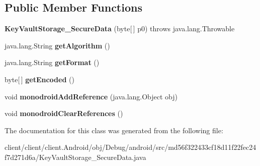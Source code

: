 \subsection*{Public Member Functions}
\begin{DoxyCompactItemize}
\item 
\hypertarget{classmd56f322433cf18d11f22fec24f7d271d6a_1_1KeyVaultStorage__SecureData_af12afd9550ec62b29d4b7789c72e3ad5}{}{\bfseries Key\+Vault\+Storage\+\_\+\+Secure\+Data} (byte\mbox{[}$\,$\mbox{]} p0)  throws java.\+lang.\+Throwable 	\label{classmd56f322433cf18d11f22fec24f7d271d6a_1_1KeyVaultStorage__SecureData_af12afd9550ec62b29d4b7789c72e3ad5}

\item 
\hypertarget{classmd56f322433cf18d11f22fec24f7d271d6a_1_1KeyVaultStorage__SecureData_a8c1ece5c0b0428451089108a2857e3a9}{}java.\+lang.\+String {\bfseries get\+Algorithm} ()\label{classmd56f322433cf18d11f22fec24f7d271d6a_1_1KeyVaultStorage__SecureData_a8c1ece5c0b0428451089108a2857e3a9}

\item 
\hypertarget{classmd56f322433cf18d11f22fec24f7d271d6a_1_1KeyVaultStorage__SecureData_a44d916ac765b3c441b206649c254911f}{}java.\+lang.\+String {\bfseries get\+Format} ()\label{classmd56f322433cf18d11f22fec24f7d271d6a_1_1KeyVaultStorage__SecureData_a44d916ac765b3c441b206649c254911f}

\item 
\hypertarget{classmd56f322433cf18d11f22fec24f7d271d6a_1_1KeyVaultStorage__SecureData_a0bdffc73318938bb464ab36f5c88deb0}{}byte\mbox{[}$\,$\mbox{]} {\bfseries get\+Encoded} ()\label{classmd56f322433cf18d11f22fec24f7d271d6a_1_1KeyVaultStorage__SecureData_a0bdffc73318938bb464ab36f5c88deb0}

\item 
\hypertarget{classmd56f322433cf18d11f22fec24f7d271d6a_1_1KeyVaultStorage__SecureData_a1f0cc969fcbee91700cd34c926c46297}{}void {\bfseries monodroid\+Add\+Reference} (java.\+lang.\+Object obj)\label{classmd56f322433cf18d11f22fec24f7d271d6a_1_1KeyVaultStorage__SecureData_a1f0cc969fcbee91700cd34c926c46297}

\item 
\hypertarget{classmd56f322433cf18d11f22fec24f7d271d6a_1_1KeyVaultStorage__SecureData_af824b091ba43fe4f690a9ddd5c07ac5d}{}void {\bfseries monodroid\+Clear\+References} ()\label{classmd56f322433cf18d11f22fec24f7d271d6a_1_1KeyVaultStorage__SecureData_af824b091ba43fe4f690a9ddd5c07ac5d}

\end{DoxyCompactItemize}


The documentation for this class was generated from the following file\+:\begin{DoxyCompactItemize}
\item 
client/client/client.\+Android/obj/\+Debug/android/src/md56f322433cf18d11f22fec24f7d271d6a/Key\+Vault\+Storage\+\_\+\+Secure\+Data.\+java\end{DoxyCompactItemize}
